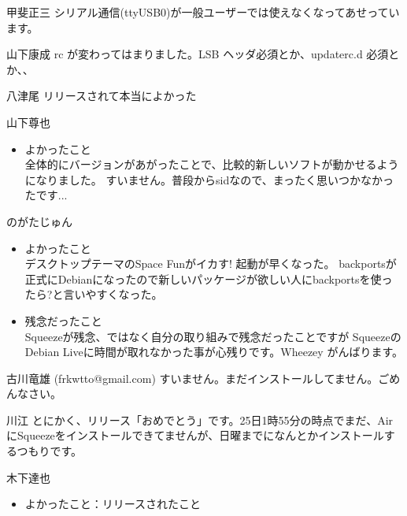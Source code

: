 \documentclass[mingoth,a4paper]{jsarticle}
\begin{document}
\begin{prework}{ 甲斐正三 }
 シリアル通信(ttyUSB0)が一般ユーザーでは使えなくなってあせっています。
\end{prework}


\begin{prework}{ 山下康成 }
 rc が変わってはまりました。LSB ヘッダ必須とか、updaterc.d 必須とか、、
\end{prework}

\begin{prework}{ 八津尾 }
リリースされて本当によかった
\end{prework}

\begin{prework}{ 山下尊也 }
 \begin{itemize}
  \item よかったこと \\
        全体的にバージョンがあがったことで、比較的新しいソフトが動かせるようになりました。
        すいません。普段からsidなので、まったく思いつかなかったです...
 \end{itemize}
\end{prework}

\begin{prework}{ のがたじゅん }
 \begin{itemize}
  \item よかったこと \\
        デスクトップテーマのSpace Funがイカす!
        起動が早くなった。
        backportsが正式にDebianになったので新しいパッケージが欲しい人にbackportsを使ったら?と言いやすくなった。
  \item 残念だったこと \\
        Squeezeが残念、ではなく自分の取り組みで残念だったことですが
        SqueezeのDebian Liveに時間が取れなかった事が心残りです。Wheezey
        がんばります。
 \end{itemize}
\end{prework}

\begin{prework}{ 古川竜雄 (frkwtto@gmail.com) }
すいません。まだインストールしてません。ごめんなさい。
\end{prework}

\begin{prework}{ 川江 }
とにかく、リリース「おめでとう」です。25日1時55分の時点でまだ、AirにSqueezeをインストールできてませんが、日曜までになんとかインストールするつもりです。
\end{prework}

\begin{prework}{ 木下達也 }
 \begin{itemize}
  \item よかったこと：リリースされたこと
 \end{itemize}
\end{prework}
\end{document}
